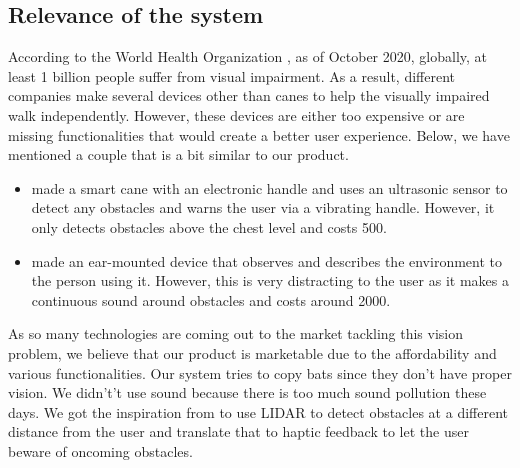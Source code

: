 \documentclass{article}
\begin{document}
\subsection{Relevance of the system} 
According to the World Health Organization \cite{WHO}, as of October 2020, globally, at least 1 billion people suffer from visual impairment. As a result, different companies make several devices other than canes to help the visually impaired walk independently. However, these devices are either too expensive or are missing functionalities that would create a better user experience. Below, we have mentioned a couple that is a bit similar to our product.
\begin{itemize}
\item \cite{Home} made a smart cane with an electronic handle and uses an ultrasonic sensor to detect any obstacles and warns the user via a vibrating handle. However, it only detects obstacles above the chest level and costs 500.


\item \cite{HORUSTECHNOLOGY} made an ear-mounted device that observes and describes the environment to the person using it. However, this is very distracting to the user as it makes a continuous sound around obstacles and costs around 2000.
\end{itemize}
As so many technologies are coming out to the market tackling this vision problem, we believe that our product is marketable due to the affordability and various functionalities.
\newline
Our system tries to copy bats since they don’t have proper vision. We didn't’t use sound because there is too much sound pollution these days. We got the inspiration from \cite{StuffMadeHere} to use LIDAR to detect obstacles at a different distance from the user and translate that to haptic feedback to let the user beware of oncoming obstacles.
\end{document}
